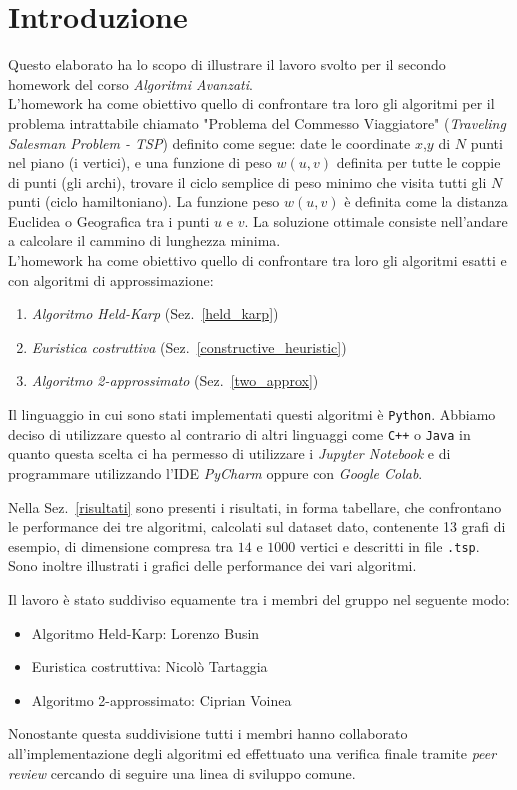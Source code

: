 \section{Introduzione}
Questo elaborato ha lo scopo di illustrare il lavoro svolto per il secondo homework del corso \textit{Algoritmi Avanzati}.\\
L'homework ha come obiettivo quello di confrontare tra loro gli algoritmi per il problema intrattabile chiamato "Problema del Commesso Viaggiatore" (\textit{Traveling Salesman Problem - TSP}) definito come segue: date le coordinate $x$,$y$ di $N$ punti nel piano (i vertici), e una funzione di peso $w(u,v)$ definita per tutte le coppie di punti (gli archi), trovare il ciclo semplice di peso minimo che visita tutti gli $N$ punti (ciclo hamiltoniano). La funzione peso $w(u,v)$ è definita come la distanza Euclidea o Geografica tra i punti $u$ e $v$. La soluzione ottimale consiste nell'andare a calcolare il cammino di lunghezza minima.  
\\
L'homework ha come obiettivo quello di confrontare tra loro gli algoritmi esatti e con algoritmi di approssimazione:
\begin{enumerate}
	\item \textit{Algoritmo Held-Karp} (Sez.~\ref{held_karp})
	\item \textit{Euristica costruttiva} (Sez.~\ref{constructive_heuristic})
	\item \textit{Algoritmo 2-approssimato} (Sez.~\ref{two_approx})
\end{enumerate}


Il linguaggio in cui sono stati implementati questi algoritmi è \texttt{Python}.
Abbiamo deciso di utilizzare questo al contrario di altri linguaggi come \texttt{C++} o \texttt{Java} in quanto questa scelta ci ha permesso di utilizzare i \textit{Jupyter Notebook} e di programmare utilizzando l'IDE \textit{PyCharm} oppure con \textit{Google Colab}.

Nella Sez.~\ref{risultati} sono presenti i risultati, in forma tabellare, che confrontano le performance dei tre algoritmi, calcolati sul dataset dato, contenente 13 grafi di esempio, di dimensione compresa tra $14$ e $1000$ vertici e descritti in file \texttt{.tsp}.
Sono inoltre illustrati i grafici delle performance dei vari algoritmi.

Il lavoro è stato suddiviso equamente tra i membri del gruppo nel seguente modo:
\begin{itemize}
	\item Algoritmo Held-Karp: Lorenzo Busin
	\item Euristica costruttiva: Nicolò Tartaggia
	\item Algoritmo 2-approssimato: Ciprian Voinea
\end{itemize}

Nonostante questa suddivisione tutti i membri hanno collaborato all'implementazione degli algoritmi ed effettuato una verifica finale tramite \textit{peer review} cercando di seguire una linea di sviluppo comune.
\pagebreak

